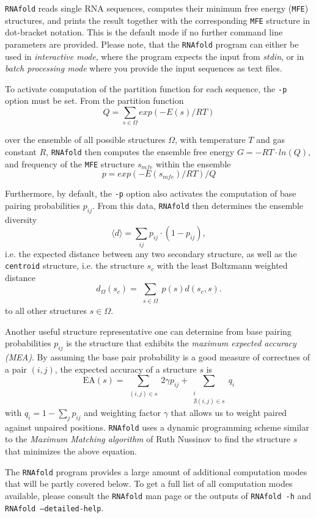\documentclass[a4paper]{article}
\begin{document}
\texttt{RNAfold} reads single RNA sequences, computes their minimum free energy
(\texttt{MFE}) structures, and prints the result together with the corresponding
\texttt{MFE} structure in dot-bracket notation. This is the default mode if no
further command line parameters are provided. Please note, that the \texttt{RNAfold}
program can either be used in \textit{interactive mode}, where the program expects
the input from \textit{stdin}, or in \textit{batch processing mode} where
you provide the input sequences as text files. 

To activate computation of the partition function for each sequence, the
\texttt{-p} option must be set. From the partition function
$$Q = \sum_{s \in \Omega} exp(-E(s) / RT)$$

over the ensemble of all possible structures $\Omega$, with temperature $T$ and gas
constant $R$, \texttt{RNAfold} then computes the ensemble free energy $G = -RT \cdot ln(Q)$,
and frequency of the \texttt{MFE} structure $s_{mfe}$ within the ensemble
$$p = exp(-E(s_{mfe}) / RT) / Q$$

Furthermore, by default, the \texttt{-p} option also activates the computation
of base pairing probabilities $p_{ij}$. From this data, \texttt{RNAfold} then
determines the ensemble diversity
$$\langle d \rangle = \sum_{ij} p_{ij} \cdot (1 - p_{ij}),$$
i.e. the expected distance between any two secondary structure, as well as the
\texttt{centroid} structure, i.e. the structure $s_c$ with the least Boltzmann weighted
distance
$$d_\Omega(s_c) = \sum_{\substack{s \in \Omega}} p(s) d(s_c, s).$$ to all other
structures $s \in \Omega$.

Another useful structure representative one can determine from base pairing probabilities
$p_{ij}$ is the structure that exhibits the \textit{maximum expected accuracy (MEA)}. By
assuming the base pair probability is a good measure of correctnes of a pair $(i,j)$, the
expected accuracy of a structure $s$ is
$$\text{EA}(s) = \sum_{\substack{(i,j) \in s}} 2\gamma p_{ij} + \sum_{\substack{i \\ \nexists (i,j) \in s}} q_i$$
with $q_i = 1 - \sum_j p_{ij}$ and weighting factor $\gamma$ that allows us to
weight paired against unpaired positions. \texttt{RNAfold} uses a dynamic programming
scheme similar to the \textit{Maximum Matching algorithm} of Ruth Nussinov to find the
structure $s$ that minimizes the above equation.

The \texttt{RNAfold} program provides a large amount of additional
computation modes that will be partly covered below. To get a full list of all
computation modes available, please consult the \texttt{RNAfold} man page or
the outputs of \texttt{RNAfold -h} and \texttt{RNAfold --detailed-help}.
\end{document}
